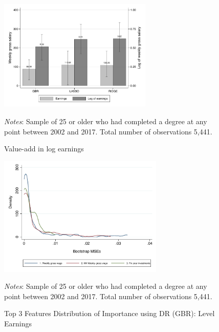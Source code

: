 \documentclass[12pt, a4paper]{article}
\begin{document}
\begin{figure}[H]
\centering
\caption{Value-add in log earnings}
\vspace{0.5cm}
  \label{fig:valadlelog}
    \includegraphics[width=0.65\textwidth]{_figures/valad_levearn_log.pdf}
\parbox{1\textwidth}{\footnotesize{\textit{Notes}: Sample of 25 or older who had completed a degree at any point between 2002 and 2017. Total number of observations 5,441.}}
\end{figure}

\begin{figure}[H]
\centering
\caption{Top 3 Features Distribution of Importance using DR (GBR): Level Earnings}
\vspace{0.5cm}
  \label{fig:dengbrlevDR} 
    \includegraphics[width=0.7\textwidth]{_figures/density_GBR_le_100_top3_DR.pdf}
\parbox{1\textwidth}{\footnotesize{\textit{Notes}: Sample of 25 or older who had completed a degree at any point between 2002 and 2017. Total number of observations 5,441.}}
\end{figure}
\end{document}
